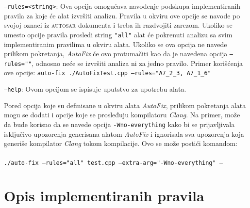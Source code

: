\documentclass[12pt,oneside]{memoir}
\begin{document}
\begin{description}
    \item \texttt{--rules=<string>}: Ova opcija omogu\'{c}ava navođenje podskupa implementiranih pravila za koje \'{c}e alat izvr\v{s}iti analizu. Pravila u okviru ove opcije
    se navode po svojoj oznaci iz \textsc{autosar} dokumenta i treba ih razdvojiti zarezom. Ukoliko se umesto opcije pravila prosledi string \texttt{"all"} alat \'{c}e pokrenuti
    analizu sa svim implementiranim pravilima u okviru alata. Ukoliko se ova opcija ne navede prilikom pokretanja, \textit{AutoFix} \'{c}e ovo protuma\v{c}iti kao da je navedena opcija \texttt{--rules=""}, odnosno ne\'{c}e se izvr\v{s}iti analiza ni za jedno pravilo.
    Primer kori\v{s}\'{c}enja ove opcije: \newline\newline
    \texttt{auto-fix ./AutoFixTest.cpp --rules="A7\_2\_3, A7\_1\_6"} \\
    \item \texttt{--help}: Ovom opcijom se ispisuje uputstvo za upotrebu alata.
  \end{description}

Pored opcija koje su definisane u okviru alata \textit{AutoFix}, prilikom pokretanja alata mogu se dodati i opcije koje se prosleđuju kompilatoru \textit{Clang}. Na primer, mo\v{z}e da bude korisno da se navede opcija \texttt{-Wno-everything} kako bi se prijavljivala isklju\v{c}ivo upozorenja generisana alatom \textit{AutoFix} i ignorisala sva upozorenja koja generi\v{s}e kompilator \textit{Clang} tokom kompilacije. Ovo se mo\v{z}e posti\'{c}i komandom: \\ \\
\texttt{./auto-fix --rules="all" test.cpp --extra-arg="-Wno-everything" --}


\section{Opis implementiranih pravila}
\label{sec:implementiranaPravila}
\end{document}
